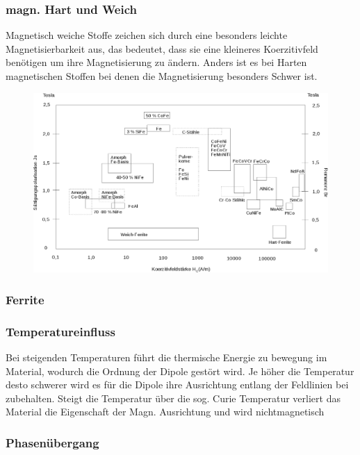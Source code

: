         \subsubsection*{magn. Hart und Weich}
            Magnetisch weiche Stoffe zeichen sich durch eine besonders leichte Magnetisierbarkeit aus, das bedeutet,
            dass sie eine kleineres Koerzitivfeld benötigen um ihre Magnetisierung zu ändern. Anders ist es bei Harten
            magnetischen Stoffen bei denen die Magnetisierung besonders Schwer ist.
            \begin{figure}[H]
                \centering
                \includegraphics{Images/Übersicht_Koerzitivfeldstärke.png}
            \end{figure}
        \subsubsection*{Ferrite}
            
        \subsubsection*{Temperatureinfluss}
            Bei steigenden Temperaturen führt die thermische Energie zu bewegung im Material, wodurch die Ordnung der
            Dipole gestört wird. Je höher die Temperatur desto schwerer wird es für die Dipole ihre Ausrichtung entlang 
            der Feldlinien bei zubehalten. Steigt die Temperatur über die sog. Curie Temperatur verliert das Material
            die Eigenschaft der Magn. Ausrichtung und wird nichtmagnetisch 
        \subsubsection*{Phasenübergang}
            
